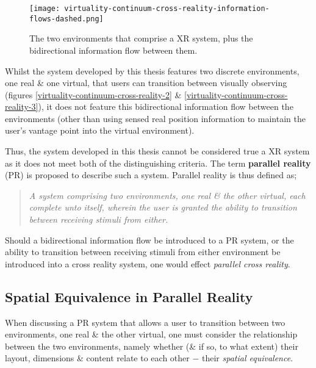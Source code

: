 \begin{figure}[h]
	\begin{center}
		\texttt{[image: virtuality-continuum-cross-reality-information-flows-dashed.png]}
		\caption{The two environments that comprise a XR system, plus the bidirectional information flow between them.}
		\label{virtuality-continuum-cross-reality-information-flows-dashed.png}
	\end{center}
\end{figure}

Whilst the system developed by this thesis features two discrete environments, one real \& one virtual, that users can transition between visually observing (figures \ref{virtuality-continuum-cross-reality-2} \& \ref{virtuality-continuum-cross-reality-3}), it does not feature this bidirectional information flow between the environments (other than using sensed real position information to maintain the user's vantage point into the virtual environment).

Thus, the system developed in this thesis cannot be considered true a XR system as it does not meet both of the distinguishing criteria. The term \textbf{parallel reality} (PR\PRfootnote{}) is proposed to describe such a system. Parallel reality is thus defined as;

\begin{quote}
	\textit{A system comprising two environments, one real \& the other virtual, each complete unto itself, wherein the user is granted the ability to transition between receiving stimuli from either.}
\end{quote}

Should a bidirectional information flow be introduced to a PR system, or the ability to transition between receiving stimuli from either environment be introduced into a cross reality system, one would effect \textit{parallel cross reality}.

\subsection{Spatial Equivalence in Parallel Reality}

\newcommand{\turklevrfootnote}{\footnote{\textit{``For virtual reality to be interesting it has to emulate the real. But you have to be able to do something in the virtual that you couldn't in the real.''}~\cite{Turkle1997}}}

When discussing a PR system that allows a user to transition between two environments, one real \& the other virtual, one must consider the relationship between the two environments, namely whether (\& if so, to what extent) their layout, dimensions \& content relate to each other $-$ their \textit{spatial equivalence}.

